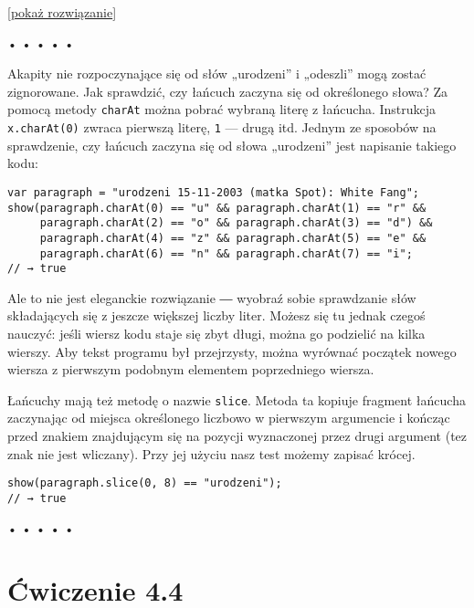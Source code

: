     
[\hyperref[sol:4.3]{pokaż rozwiązanie}]
    
    
  
  
\begin{center}
• • • • •
\end{center}
  
    
Akapity nie rozpoczynające się od słów „urodzeni” i „odeszli” mogą zostać zignorowane. Jak sprawdzić, czy łańcuch zaczyna się od określonego słowa? Za pomocą metody \texttt{charAt} można pobrać wybraną literę z łańcucha. Instrukcja \texttt{x.charAt(0)} zwraca pierwszą literę, \texttt{1} — drugą itd. Jednym ze sposobów na sprawdzenie, czy łańcuch zaczyna się od słowa „urodzeni” jest napisanie takiego kodu:

    
\begin{verbatim} 
var paragraph = "urodzeni 15-11-2003 (matka Spot): White Fang";
show(paragraph.charAt(0) == "u" && paragraph.charAt(1) == "r" &&
     paragraph.charAt(2) == "o" && paragraph.charAt(3) == "d") &&
     paragraph.charAt(4) == "z" && paragraph.charAt(5) == "e" &&
     paragraph.charAt(6) == "n" && paragraph.charAt(7) == "i";
// → true
\end{verbatim}
    
Ale to nie jest eleganckie rozwiązanie ― wyobraź sobie sprawdzanie słów składających się z jeszcze większej liczby liter. Możesz się tu jednak czegoś nauczyć: jeśli wiersz kodu staje się zbyt długi, można go podzielić na kilka wierszy. Aby tekst programu był przejrzysty, można wyrównać początek nowego wiersza z pierwszym podobnym elementem poprzedniego wiersza.

    
Łańcuchy mają też metodę o nazwie \texttt{slice}. Metoda ta kopiuje fragment łańcucha zaczynając od miejsca określonego liczbowo w pierwszym argumencie i kończąc przed znakiem znajdującym się na pozycji wyznaczonej przez drugi argument (tez znak nie jest wliczany). Przy jej użyciu nasz test możemy zapisać krócej.

    
\begin{verbatim} 
show(paragraph.slice(0, 8) == "urodzeni");
// → true
\end{verbatim}
  
  
\begin{center}
• • • • •
\end{center}
  
    
\section*{Ćwiczenie 4.4}
\label{sec:4.4}
    
